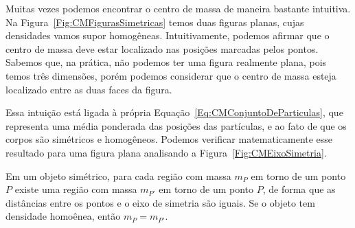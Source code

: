 Muitas vezes podemos encontrar o centro de massa de maneira bastante intuitiva. Na Figura~\ref{Fig:CMFigurasSimetricas} temos duas figuras planas, cujas densidades vamos supor homogêneas. Intuitivamente, podemos afirmar que o centro de massa deve estar localizado nas posições marcadas pelos pontos. Sabemos que, na prática, não podemos ter uma figura realmente plana, pois temos três dimensões, porém podemos considerar que o centro de massa esteja localizado entre as duas faces da figura.

Essa intuição está ligada à própria Equação~\eqref{Eq:CMConjuntoDeParticulas}, que representa uma média ponderada das posições das partículas, e ao fato de que os corpos são simétricos e homogêneos. Podemos verificar matematicamente esse resultado para uma figura plana analisando a Figura~\ref{Fig:CMEixoSimetria}.

\begin{marginfigure}
\centering
{}
\caption{Em um objeto simétrico, para cada região com massa $m_P$ em torno de um ponto $P$ existe uma região com massa $m_{P'}$ em torno de um ponto $P$, de forma que as distâncias entre os pontos e o eixo de simetria são iguais. Se o objeto tem densidade homoênea, então $m_P = m_{P'}$. \label{Fig:CMEixoSimetria}}
\end{marginfigure}

